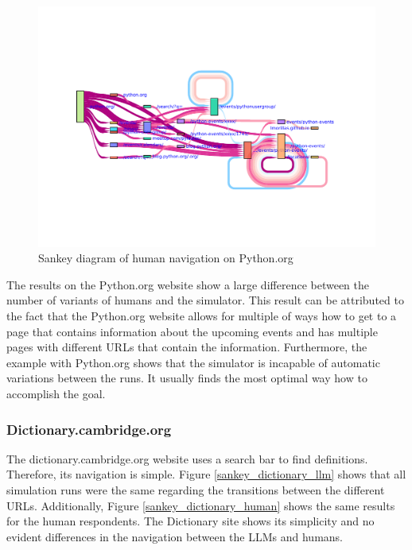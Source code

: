 \begin{figure}[H]
    \centering
    \includegraphics[width=\textwidth]{obrazky-figures/sankey_python_human.pdf}
    \caption{Sankey diagram of human navigation on Python.org}
    \label{sankey_python_human}
\end{figure}

The results on the Python.org website show a large difference between the number of variants of humans and the simulator. This result can be attributed to the fact that the Python.org website allows for multiple of ways how to get to a page that contains information about the upcoming events and has multiple pages with different URLs that contain the information. Furthermore, the example with Python.org shows that the simulator is incapable of automatic variations between the runs. It usually finds the most optimal way how to accomplish the goal.

\subsubsection{Dictionary.cambridge.org}

The dictionary.cambridge.org website uses a search bar to find definitions. Therefore, its navigation is simple. Figure \ref{sankey_dictionary_llm} shows that all simulation runs were the same regarding the transitions between the different URLs. Additionally, Figure \ref{sankey_dictionary_human} shows the same results for the human respondents. The Dictionary site shows its simplicity and no evident differences in the navigation between the LLMs and humans. 

